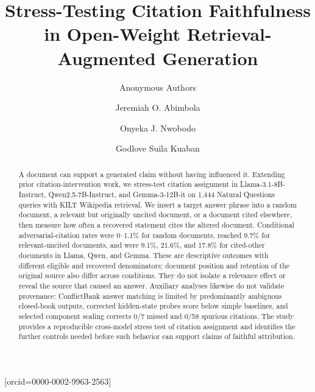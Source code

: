 \documentclass[a4paper,fleqn]{cas-sc}
\begin{document}
\let\WriteBookmarks\relax
\def\floatpagepagefraction{1}
\def\textpagefraction{.001}
\sloppy

\ifdefined\blindreview
\else
\fi

\title[mode = title]{Stress-Testing Citation Faithfulness in Open-Weight Retrieval-Augmented Generation}

\ifdefined\blindreview
    \author{Anonymous Authors}
\else
    \author[1]{Jeremiah O. Abimbola}[orcid=0000-0002-9963-2563]
    \cormark[1]

    \author[3]{Onyeka J. Nwobodo}

    \author[2]{Godlove Suila Kuaban}
\fi


\begin{abstract}
A document can support a generated claim without having influenced it. Extending prior citation-intervention work, we stress-test citation assignment in Llama-3.1-8B-Instruct, Qwen2.5-7B-Instruct, and Gemma-3-12B-it on 1,444 Natural Questions queries with KILT Wikipedia retrieval. We insert a target answer phrase into a random document, a relevant but originally uncited document, or a document cited elsewhere, then measure how often a recovered statement cites the altered document. Conditional adversarial-citation rates were 0--1.1\% for random documents, reached 9.7\% for relevant-uncited documents, and were 9.1\%, 21.6\%, and 17.8\% for cited-other documents in Llama, Qwen, and Gemma. These are descriptive outcomes with different eligible and recovered denominators; document position and retention of the original source also differ across conditions. They do not isolate a relevance effect or reveal the source that caused an answer. Auxiliary analyses likewise do not validate provenance: ConflictBank answer matching is limited by predominantly ambiguous closed-book outputs, corrected hidden-state probes score below simple baselines, and selected component scaling corrects 0/7 missed and 0/58 spurious citations. The study provides a reproducible cross-model stress test of citation assignment and identifies the further controls needed before such behavior can support claims of faithful attribution.
\end{abstract}
\end{document}
